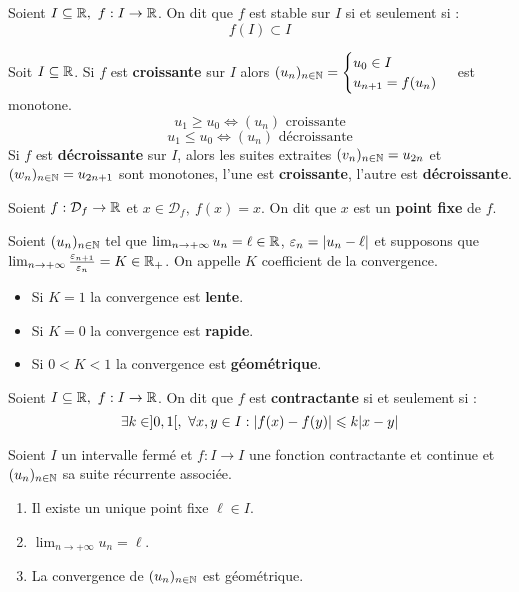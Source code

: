 \begin{definition}
	Soient $I \subseteq \mathbb{R},\ f : I \to \mathbb{R}$. On dit que $f$ est stable sur $I$ si et seulement si : 
	\[ f(I) \subset I \]
\end{definition}

\begin{proposition}
	Soit $I \subseteq \mathbb{R}$.
	Si $f$ est \textbf{croissante} sur $I$ alors 
	$
	(u_n)_{n \in \mathbb{N}} = 
	\begin{cases}
		u_0 \in I \\
		u_{n + 1} = f(u_n)
	\end{cases}
	$
	est monotone.
	\[ u_1 \geq u_0 \iff (u_n) \text{ croissante} \]
	\[ u_1 \leq u_0 \iff (u_n) \text{ décroissante} \]
	Si $f$ est \textbf{décroissante} sur $I$, alors les suites extraites $(v_n)_{n \in \mathbb{N}} = u_{2n}$ et $(w_n)_{n \in \mathbb{N}} = u_{2n + 1}$ sont monotones, l'une est \textbf{croissante}, l'autre est \textbf{décroissante}.
\end{proposition}

\begin{definition}
	Soient $f : \mathcal{D}_f \to \mathbb{R}$ et $x \in \mathcal{D}_f,\ f(x) = x$. On dit que $x$ est un \textbf{point fixe} de $f$.
\end{definition}

\begin{definition}
    Soient $(u_n)_{n \in \mathbb{N}}$ tel que $\lim_{n \to +\infty} u_n = \ell \in \mathbb{R}$, $\varepsilon_n = \abs{u_n - \ell}$ et supposons que $\lim_{n \to +\infty} \frac{\varepsilon_{n + 1}}{\varepsilon_n} = K \in \mathbb{R}_+$. 
    On appelle $K$ coefficient de la convergence.
    \begin{itemize}
        \item Si $K = 1$ la convergence est \textbf{lente}.
        \item Si $K = 0$ la convergence est \textbf{rapide}.
        \item Si $0 < K < 1$ la convergence est \textbf{géométrique}.
    \end{itemize}
\end{definition}

\begin{definition}
	Soient $I \subseteq \mathbb{R},\ f : I \to \mathbb{R}$.
    On dit que $f$ est \textbf{contractante} si et seulement si :
    \[ \exists k \in ]0, 1[,\ \forall x, y \in I : \abs{f(x) - f(y)} \leqslant k \abs{x - y} \]
\end{definition}

\begin{theorem}
	Soient $I$ un intervalle fermé et $f : I \to I$ une fonction contractante et continue et $(u_n)_{n \in \mathbb{N}}$ sa suite récurrente associée.
	\begin{enumerate}
        \item Il existe un unique point fixe $\ell \in I$.
        \item $\lim_{n \to +\infty} u_n = \ell$.
        \item La convergence de $(u_n)_{n \in \mathbb{N}}$ est géométrique.
    \end{enumerate}
\end{theorem}

